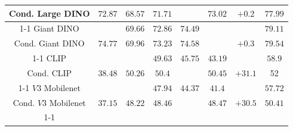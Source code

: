 \begin{table}[!htbp]
{\begin{tabular}{c|ccccccc}
			Cond. Large DINO        & \multirow{-2}{*}{$72.87$}                                                     & \textit{$68.57$}          & \textit{$71.71$}         & \textit{\pmb{$73.02$}} & \textit{$73.02$}          & \multirow{-2}{*}{{\color[HTML]{009901} $+0.2$}}                             & $77.99$                                                                          \\ \cline{1-1}
			Giant DINO              &                                                                             & \textit{$69.66$}          & \textit{$72.86$}         & \textit{$74.49$}          & \textit{\pmb{$74.74$}} & {\color[HTML]{009901} }                                                   & $79.11$                                                                          \\
			Cond. Giant DINO        & \multirow{-2}{*}{$74.77$}                                                     & \textit{$69.96$}          & \textit{$73.23$}         & \textit{$74.58$}          & \textit{\pmb{$74.96$}} & \multirow{-2}{*}{{\color[HTML]{009901} $+0.3$}}                             & $79.54$                                                                          \\ \cline{1-1}
			CLIP                    &                                                                             & \textit{\pmb{$51.54$}} & \textit{$49.63$}         & \textit{$45.75$}          & \textit{$43.19$}          & {\color[HTML]{009901} }                                                   & $58.9$                                                                           \\
			Cond. CLIP              & \multirow{-2}{*}{$38.48$}                                                     & \textit{$50.26$}          & \textit{$50.4$}          & \textit{\pmb{$50.45$}} & \textit{$50.45$}          & \multirow{-2}{*}{{\color[HTML]{009901} $+31.1$}}                            & 52                                                                             \\ \cline{1-1}
			$V3$ Mobilenet            &                                                                             & \textit{\pmb{$49.88$}} & \textit{$47.94$}         & \textit{$44.37$}          & \textit{$41.4$}           & {\color[HTML]{009901} }                                                   & $57.72$                                                                          \\
			Cond. $V3$ Mobilenet      & \multirow{-2}{*}{$37.15$}                                                     & \textit{$48.22$}          & \textit{$48.46$}         & \textit{\pmb{$48.49$}} & \textit{$48.47$}          & \multirow{-2}{*}{{\color[HTML]{009901} $+30.5$}}                            & $50.41$                                                                          \\ \cline{1-1}

\end{tabular}}
\end{table}
